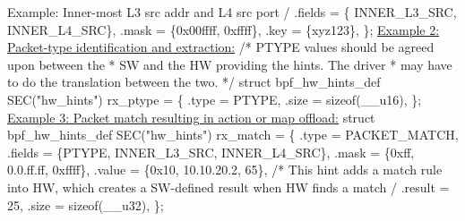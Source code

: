 \documentclass[letterpaper]{article}
\begin{document}
\newline
\indent  * Example: Inner-most L3 src addr and L4 src port
\newline
\indent  */
\newline
\indent .fields = \{ INNER\_L3\_SRC, INNER\_L4\_SRC\},
\newline
\indent .mask = \{0x00ffff, 0xffff\},
\newline
\indent .key = \{xyz123\},
\newline
\};
\newline
\newline
\underline{Example 2: Packet-type identification and extraction:}
\newline
\newline
/* PTYPE values should be agreed upon between the
\newline
 * SW and the HW providing the hints. The driver
\newline
 * may have to do the translation between the two.
\newline
 */
\newline
struct bpf\_hw\_hints\_def SEC("hw\_hints") rx\_ptype = \{
\newline
\indent .type = PTYPE,
\newline
\indent .size = sizeof(\_\_u16),
\newline
\};
\newline
\newline
\underline{Example 3: Packet match resulting in action or map offload:}
\newline
\newline
struct bpf\_hw\_hints\_def SEC("hw\_hints") rx\_match = \{
\newline
\indent .type = PACKET\_MATCH,
\newline
\indent .fields = \{PTYPE, INNER\_L3\_SRC, INNER\_L4\_SRC\},
\newline
\indent .mask = \{0xff, 0.0.ff.ff, 0xffff\},
\newline
\indent .value = \{0x10, 10.10.20.2, 65\},
\newline
\indent /* This hint adds a match rule into HW, which creates a
\newline
\indent  * SW-defined result when HW finds a match
\newline
\indent  */
\newline
\indent .result = 25,
\newline
\indent .size = sizeof(\_\_u32),
\newline
\};
\newline
\newline
\end{document}
